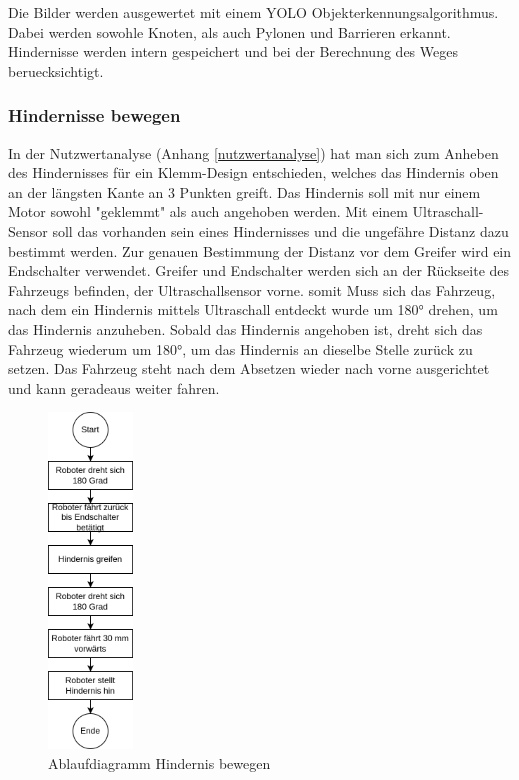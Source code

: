 Die Bilder werden ausgewertet mit einem YOLO Objekterkennungsalgorithmus. Dabei werden sowohle Knoten, als auch Pylonen und Barrieren erkannt. Hindernisse werden intern gespeichert und bei der Berechnung des Weges beruecksichtigt.


\newpage

\subsubsection{Hindernisse bewegen}

In der Nutzwertanalyse (Anhang \ref{nutzwertanalyse}) hat man sich zum Anheben des Hindernisses für ein Klemm-Design entschieden, welches das Hindernis oben an der längsten Kante an 3 Punkten greift. Das Hindernis soll mit nur einem Motor sowohl "geklemmt" als auch angehoben werden. Mit einem Ultraschall-Sensor soll das vorhanden sein eines Hindernisses und die ungefähre Distanz dazu bestimmt werden. Zur genauen Bestimmung der Distanz vor dem Greifer wird ein Endschalter verwendet.
Greifer und Endschalter werden sich an der Rückseite des Fahrzeugs befinden, der Ultraschallsensor vorne. somit Muss sich das Fahrzeug, nach dem ein Hindernis mittels Ultraschall entdeckt wurde um 180° drehen, um das Hindernis anzuheben. Sobald das Hindernis angehoben ist, dreht sich das Fahrzeug wiederum um 180°, um das Hindernis an dieselbe Stelle zurück zu setzen. Das Fahrzeug steht nach dem Absetzen wieder nach vorne ausgerichtet und kann geradeaus weiter fahren. 

\begin{figure}[H]
\centering
\includegraphics[width=0.2\textwidth]{assets/gesamtkonzept/ablaufdiagramm-hindernis-bewegen.png}
\caption{Ablaufdiagramm Hindernis bewegen}
\label{fig:ablaufdiagramm-hindernis-bewegen}
\end{figure}


